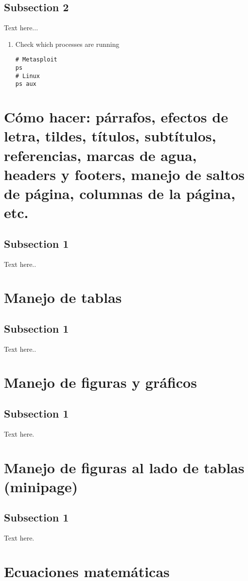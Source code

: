 \documentclass[letterpaper, 10pt, journal]{IEEEtran}
\begin{document}
\subsection{Subsection 2}
Text here...
\begin{enumerate}
\item Check which processes are running
\lstset{language=Java}
\begin{lstlisting}
# Metasploit
ps
# Linux
ps aux
\end{lstlisting}
\end{enumerate}


\section{C\'omo hacer: p\'arrafos, efectos de letra, tildes, t\'itulos, subt\'itulos, referencias, marcas de agua, headers y footers, manejo de saltos de p\'agina, columnas de la p\'agina, etc.}
\subsection{Subsection 1}
Text here..

\section{Manejo de tablas}
\subsection{Subsection 1}
Text here..

\section{Manejo de figuras y gr\'aficos}
\subsection{Subsection 1}
Text here.

\section{Manejo de figuras al lado de tablas (minipage)}
\subsection{Subsection 1}
Text here.

\section{Ecuaciones matem\'aticas}
\end{document}
